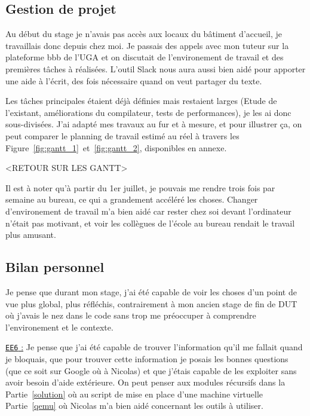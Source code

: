 \subsection{Gestion de projet}

Au début du stage je n'avais pas accès aux locaux du bâtiment d'accueil, je 
travaillais donc depuis chez moi. Je passais des appels avec mon tuteur sur la 
plateforme bbb de l'UGA et on discutait de l'environement de travail et des 
premières tâches à réalisées. L'outil Slack nous aura aussi bien aidé pour 
apporter une aide à l'écrit, des fois nécessaire quand on veut partager du 
texte.

Les tâches principales étaient déjà définies mais restaient larges (Etude de 
l'existant, améliorations du compilateur, tests de performances), je les ai 
donc sous-divisées. J'ai adapté mes travaux au fur et à mesure, et pour 
illustrer ça, on peut comparer le planning de travail estimé au réel à travers 
les Figure~\ref{fig:gantt_1}~et~\ref{fig:gantt_2}, disponibles en annexe.

<RETOUR SUR LES GANTT>

Il est à noter qu'à partir du 1er juillet, je pouvais me rendre trois fois par 
semaine au bureau, ce qui a grandement accéléré les choses. Changer 
d'environement de travail m'a bien aidé car rester chez soi devant l'ordinateur 
n'était pas motivant, et voir les collègues de l'école au bureau rendait le 
travail plus amusant.

\subsection{Bilan personnel}

Je pense que durant mon stage, j'ai été capable de voir les choses d'un point 
de vue plus global, plus réfléchis, contrairement à mon ancien stage de fin de 
DUT où j'avais le nez dans le code sans trop me préoccuper à comprendre 
l'environement et le contexte. 

\underline{\texttt{EE6} :} Je pense que j'ai été capable de trouver 
l'information qu'il me fallait quand je bloquais, que pour trouver cette 
information je posais les bonnes questions (que ce soit sur Google où à 
Nicolas) et que j'étais capable de les exploiter sans avoir besoin d'aide 
extérieure. On peut penser aux modules récursifs dans la Partie~\ref{solution} 
où au script de mise en place d'une machine virtuelle Partie~\ref{qemu} où 
Nicolas m'a bien aidé concernant les outils à utiliser.

